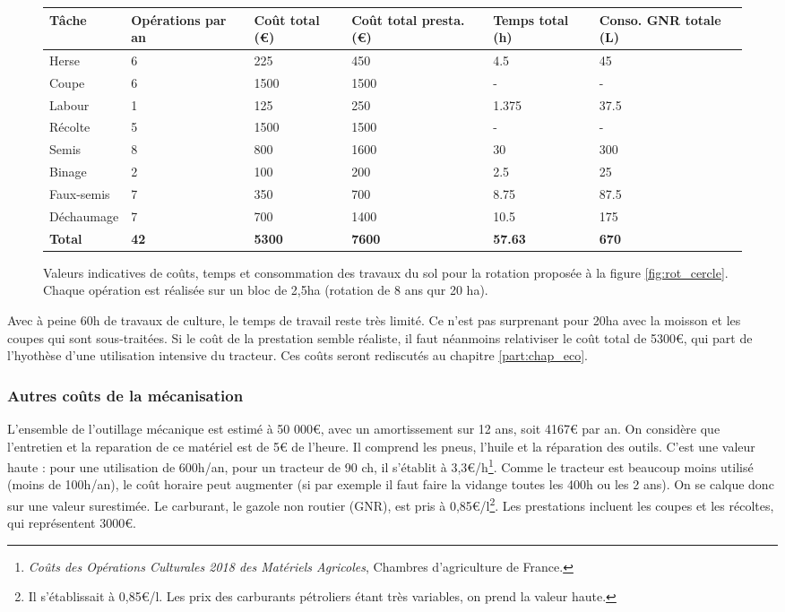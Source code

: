 \documentclass{book}
\begin{document}
\begin{figure}[h!]
\footnotesize
\center
\begin{tabular}{ | p{} | p{}| p{2cm}| p{2cm} | p{} | p{} | }
\hline
	Tâche & Opérations par an & Coût total (\euro{}) & Coût total presta. (\euro{}) & Temps total (h) & Conso. GNR totale (L) \\ \hline
	Herse & 6 & 225 & 450 & 4.5 & 45 \\ \hline
	Coupe & 6 & 1500 & 1500 & - & - \\ \hline
	Labour & 1 & 125 & 250 & 1.375 & 37.5 \\ \hline
	Récolte & 5 & 1500 & 1500 & - & - \\ \hline
	Semis & 8 & 800 & 1600 & 30 & 300 \\ \hline
	Binage & 2 & 100 & 200 & 2.5 & 25 \\ \hline
	Faux-semis & 7 & 350 & 700 & 8.75 & 87.5 \\ \hline
	Déchaumage & 7 & 700 & 1400 & 10.5 & 175 \\ \hline
	\textbf{Total} & \textbf{42} & \textbf{5300} & \textbf{7600} & \textbf{57.63} & \textbf{670} \\ \hline
\end{tabular}
\caption{Valeurs indicatives de coûts, temps et consommation des travaux du sol pour la rotation proposée à la figure \ref{fig:rot_cercle}. Chaque opération est réalisée sur un bloc de 2,5ha (rotation de 8 ans qur 20 ha).}
\label{tab:W_sol2}
\end{figure}

Avec à peine 60h de travaux de culture, le temps de travail reste très limité. Ce n'est pas surprenant pour 20ha avec la moisson et les coupes qui sont sous-traitées. Si le coût de la prestation semble réaliste, il faut néanmoins relativiser le coût total de 5300\euro{}, qui part de l'hyothèse d'une utilisation intensive du tracteur. Ces coûts seront rediscutés au chapitre \ref{part:chap_eco}.

\subsubsection{Autres coûts de la mécanisation}

L'ensemble de l'outillage mécanique est estimé à 50 000\euro{}, avec un amortissement sur 12 ans, soit 4167\euro{} par an. On considère que l'entretien et la reparation de ce matériel est de 5\euro{} de l'heure. Il comprend les pneus, l'huile et la réparation des outils. C'est une valeur haute : pour une utilisation de 600h/an, pour un tracteur de 90 ch, il s'établit à 3,3\euro{}/h\footnote{\textit{Coûts des Opérations Culturales 2018 des Matériels Agricoles}, Chambres d'agriculture de France.}. Comme le tracteur est beaucoup moins utilisé (moins de 100h/an), le coût horaire peut augmenter (si par exemple il faut faire la vidange toutes les 400h ou les 2 ans). On se calque donc sur une valeur surestimée. Le carburant, le gazole non routier (GNR), est pris à 0,85\euro{}/l\footnote{Il s'établissait à 0,85\euro{}/l. Les prix des carburants pétroliers étant très variables, on prend la valeur haute.}. Les prestations incluent les coupes et les récoltes, qui représentent 3000\euro{}.
\end{document}
